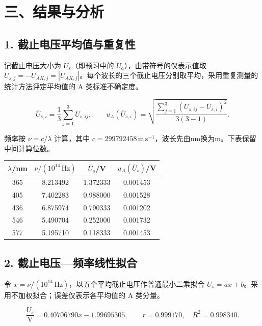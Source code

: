 \newpage
\section*{三、结果与分析}


\subsection*{1. 截止电压平均值与重复性}

记截止电压大小为 $U_s$（即预习中的 $U_a$），由带符号的仪表示值取 $U_{s,j}=-U_{AK,j}=|U_{AK,j}|$。每个波长的三个截止电压分别取平均，采用重复测量的统计方法评定平均值的 A 类标准不确定度。

\begin{equation}
\overline U_{s,i}=\frac13\sum_{j=1}^3 U_{s,ij},\qquad u_A(\overline U_{s,i})=\sqrt{\frac{\sum_{j=1}^3(U_{s,ij}-\overline U_{s,i})^2}{3(3-1)}}.
\end{equation}

频率按 $\nu=c/\lambda$ 计算，其中 $c=299792458\,\mathrm{m\,s^{-1}}$，波长先由nm换为m。下表保留中间计算位数。

\begin{center}\small{}
\renewcommand{\arraystretch}{1.25}
\begin{tabular}{|c|c|c|c|}
\hline
$\lambda$/nm & $\nu/(10^{14}\,\mathrm{Hz})$ & $\overline U_s$/V & $u_A(\overline U_s)$/V\\\hline
365 & 8.213492 & 1.372333 & 0.001453\\\hline
405 & 7.402283 & 0.988000 & 0.001528\\\hline
436 & 6.875974 & 0.790333 & 0.001202\\\hline
546 & 5.490704 & 0.252000 & 0.001732\\\hline
577 & 5.195710 & 0.118333 & 0.001453\\\hline
\end{tabular}
\end{center}


\subsection*{2. 截止电压—频率线性拟合}

令 $x=\nu/(10^{14}\,\mathrm{Hz})$，以五个平均截止电压作普通最小二乘拟合 $U_s=ax+b$。采用不加权拟合；误差仅表示各平均值的 A 类分量。

\begin{equation}
\frac{U_s}{\mathrm V}=0.40706790x-1.99695305,\qquad r=0.999170,\quad R^2=0.998340.
\end{equation}

